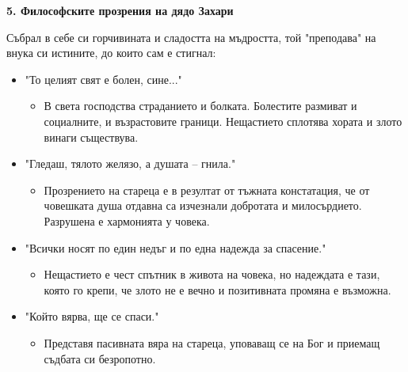 \documentclass[12pt,a4paper]{article}
\begin{document}
\vspace{0.1cm}
 
\noindent 
\textbf{5. Философските прозрения на дядо Захари}
\vspace{0.1cm}
 
\indent Събрал в себе си горчивината и сладостта на мъдростта, той "преподава" на внука си истините, до които сам е стигнал:

\begin{itemize}[leftmargin=*, noitemsep, topsep=2pt, parsep=0pt]
    \item "То целият свят е болен, сине..."
    \begin{itemize}[leftmargin=*]
        \item В света господства страданието и болката. Болестите размиват и социалните, и възрастовите граници. Нещастието сплотява хората и злото винаги съществува.
    \end{itemize}
\end{itemize}

\begin{itemize}[leftmargin=*, noitemsep, topsep=2pt, parsep=0pt]
    \item "Гледаш, тялото желязо, а душата – гнила."
    \begin{itemize}[leftmargin=*]
        \item Прозрението на стареца е в резултат от тъжната констатация, че от човешката душа отдавна са изчезнали добротата и милосърдието. Разрушена е хармонията у човека.
    \end{itemize}
\end{itemize}

\begin{itemize}[leftmargin=*, noitemsep, topsep=2pt, parsep=0pt]
    \item "Всички носят по един недъг и по една надежда за спасение."
    \begin{itemize}[leftmargin=*]
        \item Нещастието е чест спътник в живота на човека, но надеждата е тази, която го крепи, че злото не е вечно и позитивната промяна е възможна.
    \end{itemize}
\end{itemize}

\begin{itemize}[leftmargin=*, noitemsep, topsep=2pt, parsep=0pt]
    \item "Който вярва, ще се спаси."
    \begin{itemize}[leftmargin=*]
        \item Представя пасивната вяра на стареца, уповаващ се на Бог и приемащ съдбата си безропотно.
    \end{itemize}
\end{itemize}
\end{document}
